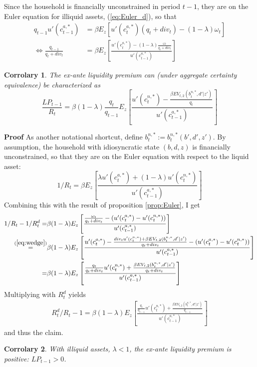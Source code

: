 \documentclass[11pt]{article} %
\newtheorem{corr}{Corrolary}
\begin{document}
Since the household is financially unconstrained in period $t-1$, they are on the Euler equation for illiquid assets, (\ref{eq:Euler_d}), so that
\begin{align}
q_{t-1} u'(c_{t-1}^{a,*}) &= \beta E_z\left[ u'(c_t^{a,*})(q_t + div_t) - (1-\lambda)\omega_t\right]\\
\Leftrightarrow \frac{q_{t-1}}{q_t+div_t} &= \beta E_z \left[ \frac{u'(c_t^{a,*}) - (1-\lambda)\frac{\omega_t}{q_t+div_t}}{u'(c_{t-1}^{a,*})} \right] 
\end{align}
\begin{corr}\label{corr:LP}
The ex-ante liquidity premium can (under aggregate certainty equivalence) be characterized as
\begin{equation}
\frac{LP_{t-1}}{R_t} = \beta (1-\lambda) \frac{q_t}{q_{t-1}} E_z \left[ \frac{u'(c_t^{n,*}) - \frac{\beta EV_{t,2}(b^{n,*}_t,d'|z')}{q_t}}{u'(c_{t-1}^{a,*})} \right]
\end{equation}
\end{corr}
\textbf{Proof} As another notational shortcut, define $b^{n,*}_t := b^{n,*}_t(b',d',z')$. By assumption, the household with idiosyncratic state $(b,d,z)$ is financially unconstrained, so that they are on the Euler equation with respect to the liquid asset:
\begin{equation}
1/R_t = \beta E_z\left[ \frac{\lambda u'(c^{a,*}_t)+(1-\lambda) u'(c^{n,*}_t)}{u'(c^{a,*}_{t-1})}\right]
\end{equation}
Combining this with the result of proposition \ref{prop:Euler}, I get
\begin{align}
1/R_t - 1/R_t^d = & \beta (1-\lambda) E_z\left[ \frac{\frac{\omega_t}{q_t+div_t}-(u'(c_t^{a,*})-u'(c_t^{n,*}))}{u'(c_{t-1}^{a,*})} \right]\\
\overset{(\ref{eq:wedge})}{=} & \beta (1-\lambda) E_z \left[ \frac{u'(c_t^{a,*}) - \frac{div_t u'(c_t^{n,*}) + \beta EV_{t,2}(b_t^{n,*},d'|z')}{q_t+div_t} - (u'(c_t^{a,*})-u'(c_t^{n,*}))}{u'(c_{t-1}^{a,*})} \right]\\
= & \beta(1-\lambda) E_z\left[ \frac{\frac{q_t}{q_t+div_t}u'(c_t^{n,*})+ \frac{\beta EV_{t,2}(b_t^{n,*},d'|z')}{q_t+div_t}}{u'(c_{t-1}^{a,*})} \right]
\end{align}
Multiplying with $R_t^d$ yields
\begin{align}
R_t^d/R_t - 1 = \beta (1-\lambda) E_z\left[ \frac{\frac{q_t}{q_{t-1}}u'(c_t^{n,*}) +  \frac{\beta EV_{t,2}(b_t^{n,*},d'|z')}{q_{t-1}}}{u'(c_{t-1}^{a,*})}\right]
\end{align}
and thus the claim.
\begin{corr}
With illiquid assets, $\lambda<1$, the ex-ante liquidity premium is positive: $LP_{t-1}>0$.
\end{corr}
\end{document}
